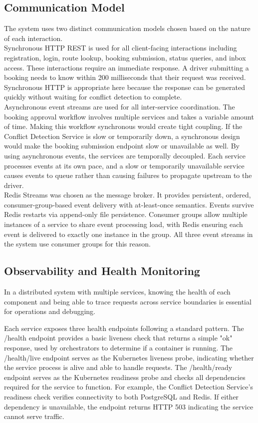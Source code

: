 \documentclass{article}
\begin{document}
\subsection{Communication Model}
The system uses two distinct communication models chosen based on the nature of each interaction.\\
Synchronous HTTP REST is used for all client-facing interactions including registration, login, route lookup, booking submission, status queries, and inbox access. These interactions require an immediate response. A driver submitting a booking needs to know within 200 milliseconds that their request was received. Synchronous HTTP is appropriate here because the response can be generated quickly without waiting for conflict detection to complete.\\
Asynchronous event streams are used for all inter-service coordination. The booking approval workflow involves multiple services and takes a variable amount of time. Making this workflow synchronous would create tight coupling. If the Conflict Detection Service is slow or temporarily down, a synchronous design would make the booking submission endpoint slow or unavailable as well. By using asynchronous events, the services are temporally decoupled. Each service processes events at its own pace, and a slow or temporarily unavailable service causes events to queue rather than causing failures to propagate upstream to the driver.\\
Redis Streams was chosen as the message broker. It provides persistent, ordered, consumer-group-based event delivery with at-least-once semantics. Events survive Redis restarts via append-only file persistence. Consumer groups allow multiple instances of a service to share event processing load, with Redis ensuring each event is delivered to exactly one instance in the group. All three event streams in the system use consumer groups for this reason.

\subsection{Observability and Health Monitoring}
In a distributed system with multiple services, knowing the health of each component and being able to trace requests across service boundaries is essential for operations and debugging.

Each service exposes three health endpoints following a standard pattern. The /health endpoint provides a basic liveness check that returns a simple "ok" response, used by orchestrators to determine if a container is running. The /health/live endpoint serves as the Kubernetes liveness probe, indicating whether the service process is alive and able to handle requests. The /health/ready endpoint serves as the Kubernetes readiness probe and checks all dependencies required for the service to function. For example, the Conflict Detection Service's readiness check verifies connectivity to both PostgreSQL and Redis. If either dependency is unavailable, the endpoint returns HTTP 503 indicating the service cannot serve traffic.
\end{document}
